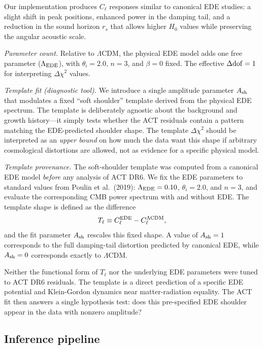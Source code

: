 \documentclass[twocolumn,showpacs,preprintnumbers,amsmath,amssymb,prd]{revtex4-2}
\newcommand{\lcdm}{$\Lambda$CDM}
\begin{document}
Our implementation produces $C_\ell$ responses similar to canonical EDE studies: 
a slight shift in peak positions, enhanced power in the damping tail, and a 
reduction in the sound horizon $r_s$ that allows higher $H_0$ values while 
preserving the angular acoustic scale.

\emph{Parameter count.} Relative to \lcdm, the physical EDE model adds one 
free parameter ($\Lambda_{\rm EDE}$), with $\theta_i = 2.0$, $n = 3$, and 
$\beta = 0$ fixed. The effective $\Delta{\rm dof} = 1$ for interpreting 
$\Delta\chi^2$ values.

\emph{Template fit (diagnostic tool).} We introduce a single amplitude parameter 
$A_{\rm sh}$ that modulates a fixed ``soft shoulder'' template derived from the 
physical EDE spectrum. The template is deliberately agnostic about the background 
and growth history---it simply tests whether the ACT residuals contain a pattern 
matching the EDE-predicted shoulder shape. The template $\Delta\chi^2$ should be 
interpreted as an \emph{upper bound} on how much the data want this shape if 
arbitrary cosmological distortions are allowed, not as evidence for a specific 
physical model.

\emph{Template provenance.} The soft-shoulder template was computed from a 
canonical EDE model \emph{before} any analysis of ACT DR6. We fix the EDE 
parameters to standard values from Poulin et al.\ (2019): $\Lambda_{\rm EDE} = 0.10$, 
$\theta_i = 2.0$, and $n = 3$, and evaluate the corresponding CMB power spectrum 
with and without EDE. The template shape is defined as the difference
\begin{equation}
T_\ell \equiv C_\ell^{\rm EDE} - C_\ell^{\Lambda{\rm CDM}},
\end{equation}
and the fit parameter $A_{\rm sh}$ rescales this fixed shape. A value of 
$A_{\rm sh} = 1$ corresponds to the full damping-tail distortion predicted 
by canonical EDE, while $A_{\rm sh} = 0$ corresponds exactly to \lcdm.

Neither the functional form of $T_\ell$ nor the underlying EDE parameters 
were tuned to ACT DR6 residuals. The template is a direct prediction of a 
specific EDE potential and Klein-Gordon dynamics near matter-radiation 
equality. The ACT fit then answers a single hypothesis test: does this 
pre-specified EDE shoulder appear in the data with nonzero amplitude?

\subsection{Inference pipeline}
\end{document}
